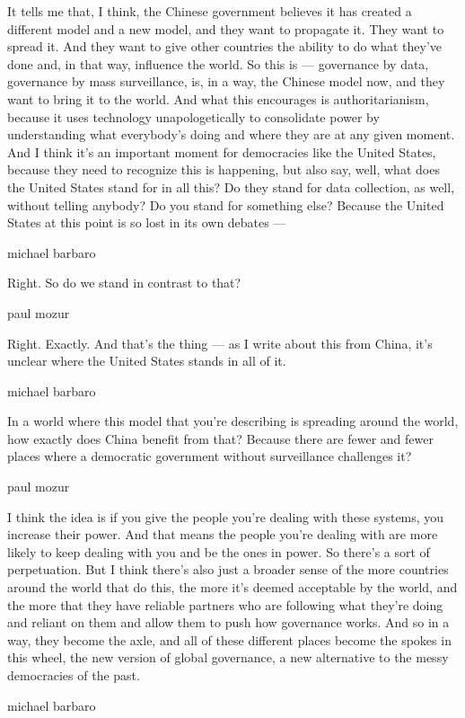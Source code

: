 It tells me that, I think, the Chinese government believes it has
created a different model and a new model, and they want to propagate
it. They want to spread it. And they want to give other countries the
ability to do what they've done and, in that way, influence the world.
So this is --- governance by data, governance by mass surveillance, is,
in a way, the Chinese model now, and they want to bring it to the world.
And what this encourages is authoritarianism, because it uses technology
unapologetically to consolidate power by understanding what everybody's
doing and where they are at any given moment. And I think it's an
important moment for democracies like the United States, because they
need to recognize this is happening, but also say, well, what does the
United States stand for in all this? Do they stand for data collection,
as well, without telling anybody? Do you stand for something else?
Because the United States at this point is so lost in its own debates
---

michael barbaro

Right. So do we stand in contrast to that?

paul mozur

Right. Exactly. And that's the thing --- as I write about this from
China, it's unclear where the United States stands in all of it.

michael barbaro

In a world where this model that you're describing is spreading around
the world, how exactly does China benefit from that? Because there are
fewer and fewer places where a democratic government without
surveillance challenges it?

paul mozur

I think the idea is if you give the people you're dealing with these
systems, you increase their power. And that means the people you're
dealing with are more likely to keep dealing with you and be the ones in
power. So there's a sort of perpetuation. But I think there's also just
a broader sense of the more countries around the world that do this, the
more it's deemed acceptable by the world, and the more that they have
reliable partners who are following what they're doing and reliant on
them and allow them to push how governance works. And so in a way, they
become the axle, and all of these different places become the spokes in
this wheel, the new version of global governance, a new alternative to
the messy democracies of the past.

michael barbaro

